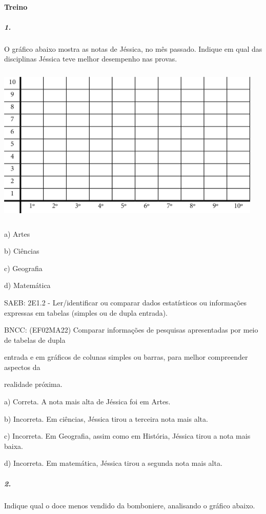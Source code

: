 \paragraph{Treino}\label{treino-6}

\subparagraph{1.}\label{section-86}

O gráfico abaixo mostra as notas de Jéssica, no mês passado. Indique em
qual das disciplinas Jéssica teve melhor desempenho nas provas.

\includegraphics[width=5.00000in,height=3.01042in]{media/image97.png}

a) Artes

b) Ciências

c) Geografia

d) Matemática

SAEB: 2E1.2 - Ler/identificar ou comparar dados estatísticos ou
informações expressas em tabelas (simples ou de dupla entrada).

BNCC: (EF02MA22) Comparar informações de pesquisas apresentadas por meio
de tabelas de dupla

entrada e em gráficos de colunas simples ou barras, para melhor
compreender aspectos da

realidade próxima.

a) Correta. A nota mais alta de Jéssica foi em Artes.

b) Incorreta. Em ciências, Jéssica tirou a terceira nota mais alta.

c) Incorreta. Em Geografia, assim como em História, Jéssica tirou a nota
mais baixa.

d) Incorreta. Em matemática, Jéssica tirou a segunda nota mais alta.

\subparagraph{2. }\label{section-87}

Indique qual o doce menos vendido da bomboniere, analisando o gráfico
abaixo.

